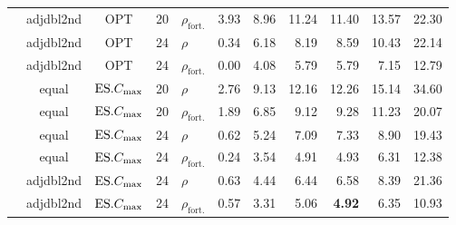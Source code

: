 \begin{table}[ht]
{\begin{tabular}{lcc@{ }c@{ }lrrrrrr}
& adjdbl2nd & OPT & 20 & $\rho_{\text{fort.}}$ & 3.93 & 8.96 & 11.24 & 11.40 & 
13.57 & 22.30 \\ 
& adjdbl2nd & OPT & 24 & $\rho$ & 0.34 & 6.18 & 8.19 & 8.59 & 10.43 & 22.14 \\ 
& adjdbl2nd & OPT & 24 & $\rho_{\text{fort.}}$ & 0.00 & 4.08 & 5.79 & 5.79 & 
7.15 & 12.79 \\ 
& equal & $\text{ES}.{C_{\max}}$ & 20 & $\rho$ & 2.76 & 9.13 & 12.16 & 12.26 & 15.14 & 
34.60 
\\ 
& equal & $\text{ES}.{C_{\max}}$ & 20 & $\rho_{\text{fort.}}$ & 1.89 & 6.85 & 9.12 & 9.28 & 
11.23 & 20.07 \\ 
& equal & $\text{ES}.{C_{\max}}$ & 24 & $\rho$ & 0.62 & 5.24 & 7.09 & 7.33 & 8.90 & 19.43 
\\ 
& equal & $\text{ES}.{C_{\max}}$ & 24 & $\rho_{\text{fort.}}$ & 0.24 & 3.54 & 4.91 & 4.93 & 
6.31 & 12.38 \\ 
& adjdbl2nd & $\text{ES}.{C_{\max}}$ & 24 & $\rho$ & 0.63 & 4.44 & 6.44 & 6.58 & 8.39 & 
21.36 \\ 
& adjdbl2nd & $\text{ES}.{C_{\max}}$ & 24 & $\rho_{\text{fort.}}$ & 0.57 & 3.31 & 5.06 & 
\textbf{4.92} & 
6.35 & 10.93 \\ 
\bottomrule
\end{tabular}}
\end{table}